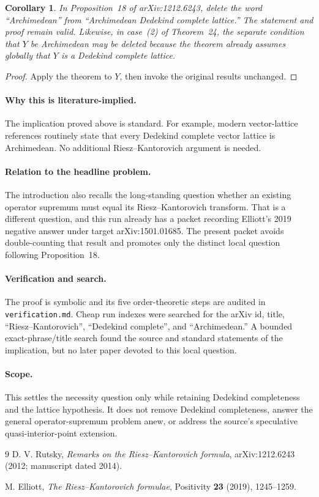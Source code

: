 \documentclass[11pt]{article}
\newtheorem*{corollary}{Corollary}
\begin{document}
\begin{corollary}
In Proposition~18 of arXiv:1212.6243, delete the word
``Archimedean'' from ``Archimedean Dedekind complete lattice.''  The statement
and proof remain valid.  Likewise, in case~(2) of Theorem~24, the separate
condition that $Y$ be Archimedean may be deleted because the theorem already
assumes globally that $Y$ is a Dedekind complete lattice.
\end{corollary}

\begin{proof}
Apply the theorem to $Y$, then invoke the original results unchanged.
\end{proof}

\paragraph{Why this is literature-implied.}
The implication proved above is standard.  For example, modern vector-lattice
references routinely state that every Dedekind complete vector lattice is
Archimedean.  No additional Riesz--Kantorovich argument is needed.

\paragraph{Relation to the headline problem.}
The introduction also recalls the long-standing question whether an existing
operator supremum must equal its Riesz--Kantorovich transform.  That is a
different question, and this run already has a packet recording Elliott's
2019 negative answer under target arXiv:1501.01685.  The present packet avoids
double-counting that result and promotes only the distinct local question
following Proposition~18.

\paragraph{Verification and search.}
The proof is symbolic and its five order-theoretic steps are audited in
\texttt{verification.md}.  Cheap run indexes were searched for the arXiv id,
title, ``Riesz--Kantorovich'', ``Dedekind complete'', and ``Archimedean.''  A
bounded exact-phrase/title search found the source and standard statements of
the implication, but no later paper devoted to this local question.

\paragraph{Scope.}
This settles the necessity question only while retaining Dedekind completeness
and the lattice hypothesis.  It does not remove Dedekind completeness, answer
the general operator-supremum problem anew, or address the source's speculative
quasi-interior-point extension.

\begin{thebibliography}{9}
D. V. Rutsky,
\emph{Remarks on the Riesz--Kantorovich formula},
arXiv:1212.6243 (2012; manuscript dated 2014).

M. Elliott,
\emph{The Riesz--Kantorovich formulae},
Positivity \textbf{23} (2019), 1245--1259.
\end{thebibliography}
\end{document}
